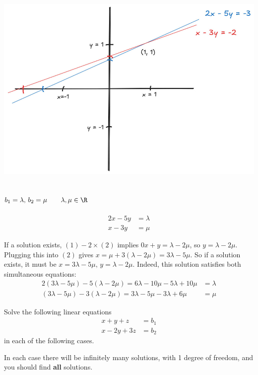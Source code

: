 \documentclass[a4paper]{article}
\begin{document}
\begin{center}\includegraphics[scale=0.35]{Q1b}\end{center}

\subsection{$b_1 = \lambda,\, b_2 = \mu \qquad \lambda, \mu \in \R$} %

\begin{align*}
2x - 5y &= \lambda \tag{1} \\
x - 3y &= \mu \tag{2}
\end{align*}

If a solution exists, $(1) - 2 \times (2)$ implies $0x + y = \lambda - 2\mu$, so $y=\lambda - 2\mu$. Plugging this into $(2)$ gives $x = \mu + 3(\lambda - 2\mu) = 3\lambda - 5\mu$.
So if a solution exists, it must be $x=3\lambda - 5\mu,\, y=\lambda - 2\mu$. Indeed, this solution satisfies both simultaneous equations:
\begin{align*}
2(3\lambda - 5\mu) - 5(\lambda - 2\mu) = 6\lambda - 10\mu - 5\lambda + 10\mu &= \lambda \\
(3\lambda - 5\mu) - 3(\lambda - 2\mu) = 3\lambda - 5\mu - 3\lambda + 6\mu &= \mu
\end{align*}


\begin{questionbody}
Solve the following linear equations
\begin{align*}
x + y + z &= b_1 \\
x - 2y + 3z &= b_2
\end{align*}
in each of the following cases.

In each case there will be infinitely many solutions, with 1 degree of freedom, and
you should find \textbf{all} solutions.
\end{questionbody}
\end{document}
